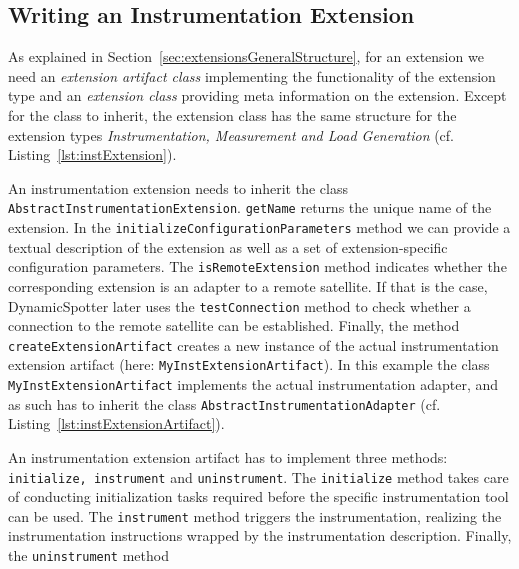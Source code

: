 \documentclass{report}
\newcommand{\DS}{DynamicSpotter }
\begin{document}
\subsection{Writing an Instrumentation Extension}
As explained in Section~\ref{sec:extensionsGeneralStructure}, for an extension we need an \emph{extension artifact
class} implementing the functionality of the extension type and an \emph{extension class} providing meta information on
the extension. Except for the class to inherit, the extension class has the same structure for the extension types
\emph{Instrumentation, Measurement and Load Generation} (cf. Listing~\ref{lst:instExtension}). 

An instrumentation extension needs to inherit the class \texttt{AbstractInstrumentationExtension}. \texttt{getName}
returns the unique name of the extension. In the \texttt{initializeConfigurationParameters} method we can provide a
textual description of the extension as well as a set of extension-specific configuration parameters. The
\texttt{isRemoteExtension} method indicates whether the corresponding extension is an adapter to a remote satellite. If
that is the case, \DS later uses the \texttt{testConnection} method to check whether a connection to the remote
satellite can be established. Finally, the method \texttt{createExtensionArtifact} creates a new instance of the actual
instrumentation extension artifact (here: \texttt{MyInstExtensionArtifact}). In this example the class
\texttt{MyInstExtensionArtifact} implements the actual instrumentation adapter, and as such has to inherit the class
\texttt{AbstractInstrumentationAdapter} (cf. Listing~\ref{lst:instExtensionArtifact}).

An instrumentation extension artifact has to implement three methods: \texttt{initialize, instrument} and
\texttt{uninstrument}. The \texttt{initialize} method takes care of conducting initialization tasks required before the
specific instrumentation tool can be used. The \texttt{instrument} method triggers the instrumentation, realizing the
instrumentation instructions wrapped by the instrumentation description. Finally, the \texttt{uninstrument} method
\end{document}

